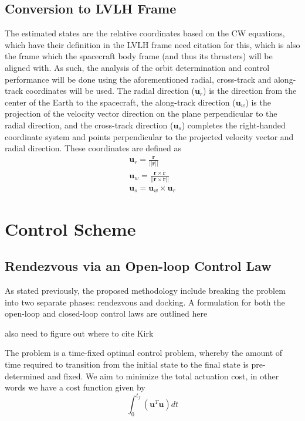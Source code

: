 \documentclass[conf]{new-aiaa}
\begin{document}
\subsection{Conversion to LVLH Frame}
The estimated states are the relative coordinates based on the CW equations, which have their definition in the LVLH frame {\color{red} need citation for this}, which is also the frame which the spacecraft body frame (and thus its thrusters) will be aligned with.  As such, the analysis of the orbit determination and control performance will be done using the aforementioned radial, cross-track and along-track coordinates will be used.  The radial direction ($\bm u_r$) is the direction from the center of the Earth to the spacecraft, the along-track direction ($\bm u_w$) is the projection of the velocity vector direction on the plane perpendicular to the radial direction, and the cross-track direction ($\bm u_s$) completes the right-handed coordinate system and points perpendicular to the projected velocity vector and radial direction.  These coordinates are defined as \cite{vallado}
\begin{subequations}\begin{gather}\bm u_r=\frac{\bm r}{||\bm r||} \\ \bm u_w=\frac{\bm r \times \dot{\bm r}}{||\bm r \times \dot{\bm r}||} \\ \bm u_s=\bm u_w \times \bm u_r\end{gather}\end{subequations}





\section{Control Scheme}
\subsection{Rendezvous via an Open-loop Control Law}
As stated previously, the proposed methodology include breaking the problem into two separate phases: rendezvous and docking.  A formulation for both the open-loop and closed-loop control laws are outlined here

{\color{red} also need to figure out where to cite Kirk\cite{kirk}}

{\color{red} The problem is a time-fixed optimal control problem, whereby the amount of time required to transition from the initial state to the final state is pre-determined and fixed.  We aim to minimize the total actuation cost, in other words we have a cost function given by
\begin{equation}
    \int_0^{t_f} \left(\bm u^T \bm u\right) dt
    \label{eq:J}
\end{equation}
}
\end{document}
